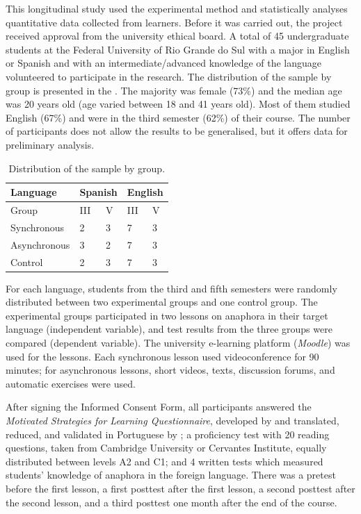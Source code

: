 \documentclass{textolivre}
\begin{document}
This longitudinal study used the experimental method and statistically
analyses quantitative data collected from learners. Before it was
carried out, the project received approval from the university ethical
board. A total of 45 undergraduate students at the Federal University of
Rio Grande do Sul with a major in English or Spanish and with an
intermediate/advanced knowledge of the language volunteered to
participate in the research. The distribution of the sample by group is
presented in the . The majority was female (73\%) and the
median age was 20 years old (age varied between 18 and 41 years old).
Most of them studied English (67\%) and were in the third semester
(62\%) of their course. The number of participants does not allow the
results to be generalised, but it offers data for preliminary analysis.

\begin{table}[htpb]
\caption{Distribution of the sample by group.}
\label{tbl01}
\centering
\begin{tabular}{lllll}
\toprule
Language & \multicolumn{2}{l}{Spanish} & \multicolumn{2}{l}{English} \\
\midrule 
Group & III & V & III & V\\
Synchronous & 2 & 3 & 7 & 3\\
Asynchronous & 3 & 2 & 7 & 3\\
Control & 2 & 3 & 7 & 3\\
\bottomrule
\end{tabular}
\end{table}


For each language, students from the third and fifth semesters were
randomly distributed between two experimental groups and one control
group. The experimental groups participated in two lessons on anaphora
in their target language (independent variable), and test results from
the three groups were compared (dependent variable). The university
e-learning platform (\emph{Moodle}) was used for the lessons. Each
synchronous lesson used videoconference for 90 minutes; for asynchronous
lessons, short videos, texts, discussion forums, and automatic exercises
were used.

After signing the Informed Consent Form, all participants answered the
\emph{Motivated Strategies for Learning Questionnaire}, developed by
\textcite{pintrich_reliability_1993} and translated, reduced,
and validated in Portuguese by \textcite{mckeachie_2008}; a
proficiency test with 20 reading questions, taken from Cambridge
University or Cervantes Institute, equally distributed between levels A2
and C1; and 4 written tests which measured students' knowledge of
anaphora in the foreign language. There was a pretest before the first
lesson, a first posttest after the first lesson, a second posttest after
the second lesson, and a third posttest one month after the end of the
course.
\end{document}
